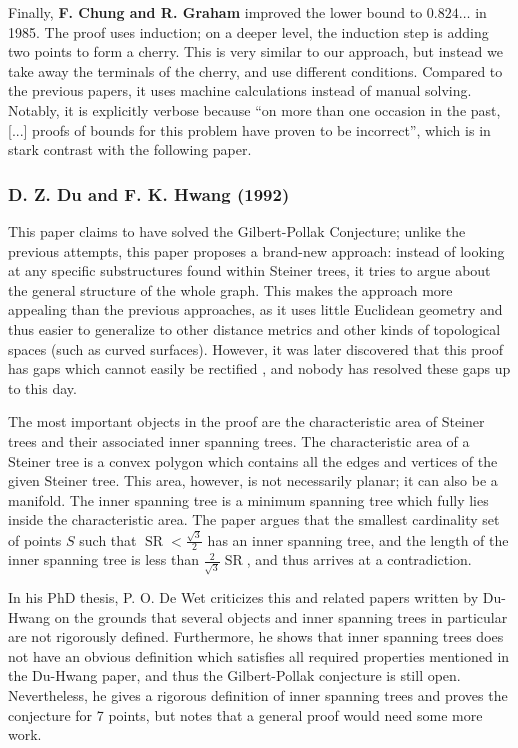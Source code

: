 \documentclass{mpaper}
\begin{document}
Finally, \textbf{F. Chung and R. Graham} \cite{finalb} improved the lower bound to $0.824\dots$ in 1985. The proof uses induction; on a deeper level, the induction step is adding two points to form a cherry.  This is very similar to our approach, but instead we take away the terminals of the cherry, and use different conditions. Compared to the previous papers, it uses machine calculations instead of manual solving. Notably, it is explicitly verbose because ``on more than one occasion in the past, [...] proofs of bounds for this problem have proven to be incorrect'', which is in stark contrast with the following paper.

\subsubsection{D. Z. Du and F. K. Hwang (1992) \cite{doi:10.1073/pnas.87.23.9464}}
This paper claims to have solved the Gilbert-Pollak Conjecture; unlike the previous  attempts, this paper proposes a brand-new approach: instead of looking at any specific substructures found within Steiner trees, it tries to argue about the general structure of the whole graph. This makes the approach more appealing than the previous approaches, as it uses little Euclidean geometry and thus easier to generalize to other distance metrics and other kinds of topological spaces (such as curved surfaces). However, it was later discovered that this proof has gaps which cannot easily be rectified \cite{Ivanov2012}, and nobody has resolved these gaps up to this day.


The most important objects in the proof are the characteristic area of Steiner trees and their associated inner spanning trees. The characteristic area of a Steiner tree is a convex polygon which contains all the edges and vertices of the given Steiner tree. This area, however, is not necessarily planar; it can also be a manifold. The inner spanning tree is a minimum spanning tree which fully lies inside the characteristic area. The paper argues that the smallest cardinality set of points $S$ such that $\operatorname{SR}<\frac{\sqrt{3}}{2}$ has an inner spanning tree, and the length of the inner spanning tree is less than $\frac{2}{\sqrt{3}}\operatorname{SR}$, and thus arrives at a contradiction.

In his PhD thesis, P. O. De Wet \cite{po} criticizes this and related papers written by Du-Hwang on the grounds that several objects and inner spanning trees in particular are not rigorously defined. Furthermore, he shows that inner spanning trees does not have an obvious definition which satisfies all required properties mentioned in the Du-Hwang paper, and thus the Gilbert-Pollak conjecture is still open. Nevertheless, he gives a rigorous definition of inner spanning trees and proves the conjecture for 7 points, but notes that a general proof would need some more work.
\end{document}

